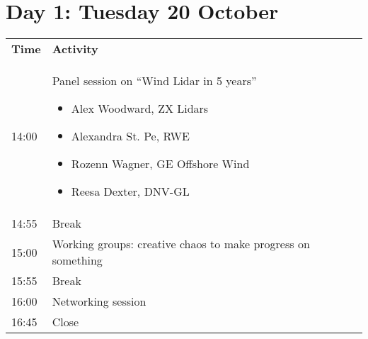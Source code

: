\section{Day 1: Tuesday 20 October}

\begin{table}[!h]
 \centering
 \begin{tabular}{@{}|p{}|p{}|@{}}
 \rowcolor{Task32Blue2} \textbf{Time} & \textbf{Activity} \\
 14:00 & Panel session on “Wind Lidar in 5 years”
  \begin{itemize}
        \item Alex Woodward, ZX Lidars
        \item Alexandra St. Pe, RWE
        \item Rozenn Wagner, GE Offshore Wind
        \item Reesa Dexter, DNV-GL
    \end{itemize} \\
 14:55 & Break \\
 15:00 & Working groups: creative chaos to make progress on something\\
 15:55 & Break \\
 16:00 & Networking session\\
 16:45 & Close \\
 \end{tabular}
 \label{tab:day1-agenda}
\end{table}
